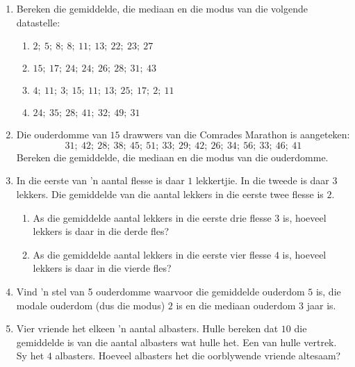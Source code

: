 \begin{exercises}{}{
    \begin{enumerate}[noitemsep, label=\textbf{\arabic*}.]

    \item Bereken die gemiddelde, die mediaan en die modus van die volgende datastelle:
      \begin{enumerate}[noitemsep, label=\textbf{(\alph*)} ]
      \item $2;~5;~8;~8;~11;~13;~22;~23;~27$
      \item $15;~17;~24;~24;~26;~28;~31;~43$
      \item $4;~11;~3;~15;~11;~13;~25;~17;~2;~11$
      \item $24;~35;~28;~41;~32;~49;~31$
      \end{enumerate}
    \item Die ouderdomme van $15$ drawwers van die  Comrades Marathon is aangeteken:
      \begin{equation*}
        31;~42;~28;~38;~45;~51;~33;~29;~42;~26;~34;~56;~33;~46;~41
      \end{equation*}
      Bereken die gemiddelde, die mediaan en die modus van die ouderdomme.
    \item In die eerste van ’n aantal flesse is daar $1$ lekkertjie. In die tweede is daar $3$ lekkers. Die gemiddelde van die aantal lekkers in die eerste twee flesse is $2$.
      \begin{enumerate}[noitemsep, label=\textbf{(\alph*)} ]
      \item As die gemiddelde aantal lekkers in die eerste drie flesse $3$ is, hoeveel lekkers is daar in die derde fles?
      \item As die gemiddelde aantal lekkers in die eerste vier flesse $4$ is, hoeveel lekkers is daar in die vierde fles?
      \end{enumerate}
    \item Vind ’n stel van 5 ouderdomme waarvoor die gemiddelde ouderdom $5$ is, die modale ouderdom (dus die modus) $2$ is en die mediaan ouderdom $3$ jaar is.
    \item Vier vriende het elkeen ’n aantal albasters. Hulle bereken dat $10$ die gemiddelde is van die aantal albasters wat hulle het. Een van hulle vertrek. Sy het $4$ albasters. Hoeveel albasters het die oorblywende vriende altesaam?
    \end{enumerate}
}
\end{exercises}


